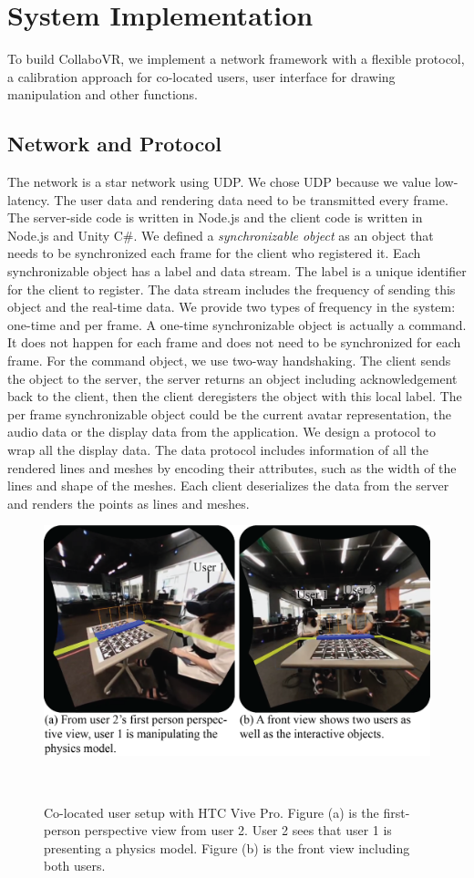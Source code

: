 \documentclass{sigchi}
\begin{document}
\section{System Implementation}
To build CollaboVR, we implement a network framework with a flexible protocol, a calibration approach for co-located users, user interface for drawing manipulation and other functions.

\subsection{Network and Protocol}
The network is a star network using UDP. We chose UDP because we value low-latency. The user data and rendering data need to be transmitted every frame. The server-side code is written in Node.js and the client code is written in Node.js and Unity C\#. We defined a \textit{synchronizable object} as an object that needs to be synchronized each frame for the client who registered it. Each synchronizable object has a label and data stream. The label is a unique identifier for the client to register. The data stream includes the frequency of sending this object and the real-time data. We provide two types of frequency in the system: one-time and per frame. A one-time synchronizable object is actually a command. It does not happen for each frame and does not need to be synchronized for each frame. For the command object, we use two-way handshaking. The client sends the object to the server, the server returns an object including acknowledgement back to the client, then the client deregisters the object with this local label. The per frame synchronizable object could be the current avatar representation, the audio data or the display data from the application. We design a protocol to wrap all the display data. The data protocol includes information of all the rendered lines and meshes by encoding their attributes, such as the width of the lines and shape of the meshes. Each client deserializes the data from the server and renders the points as lines and meshes.


\begin{figure}[tb!]
 \centering
 \includegraphics[width=0.95\columnwidth]{Figure5.png}
 \caption{Co-located user setup with HTC Vive Pro. Figure (a) is the first-person perspective view from user 2. User 2 sees that user 1 is presenting a physics model. Figure (b) is the front view including both users.
 }~\label{fig:vivepro}
\end{figure}
\end{document}
